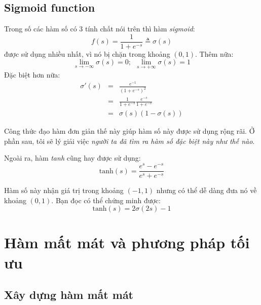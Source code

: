  
 
\subsection{Sigmoid function}
 
Trong số các hàm số có 3 tính chất nói trên thì hàm \textit{sigmoid}: 
\begin{equation*} 
f(s) = \frac{1}{1 + e^{-s}} \triangleq \sigma(s) 
\end{equation*} 
được sử dụng nhiều nhất, vì nó bị chặn trong khoảng $(0, 1)$. Thêm nữa: 
\begin{equation*} 
\lim_{s \rightarrow -\infty}\sigma(s) = 0; ~~ \lim_{s \rightarrow +\infty}\sigma(s) = 1  
\end{equation*} 
Đặc biệt hơn nữa: 
\begin{eqnarray*}
\sigma'(s) &=& \frac{e^{-1}}{(1 + e^{-s})^2} \\\ 
&=& \frac{1}{1 + e^{-s}} \frac{e^{-s}}{1 + e^{-s}} \\\ 
&=& \sigma(s)(1 - \sigma(s)) 
\end{eqnarray*}

Công thức đạo hàm đơn giản thế này giúp hàm số này được sử dụng rộng rãi. Ở phần sau, tôi sẽ lý giải việc \textit{người ta đã tìm ra hàm số đặc biệt này như thế nào}. 
 
\index{tanh function} 
Ngoài ra, hàm \textit{tanh} cũng hay được sử dụng:  
\begin{equation*} 
\text{tanh}(s) = \frac{e^{s} - e^{-s}}{e^s + e^{-s}} 
\end{equation*} 
 
Hàm số này nhận giá trị trong khoảng $(-1, 1)$ nhưng có thể dễ dàng đưa nó về khoảng $(0, 1)$. Bạn đọc có thể chứng minh được: 
\begin{equation*} 
\text{tanh}(s) = 2\sigma(2s) - 1 
\end{equation*} 
 
 
\section{Hàm mất mát và phương pháp tối ưu}
 
 
\subsection{Xây dựng hàm mất mát}
 
